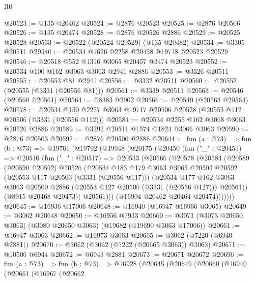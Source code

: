 \begin{lexlean}{R0}
\begin{coremodule}
@20523 := @135 @20462
@20524 := @2876 @20523
@20525 := @2876 @20506
@20526 := @135 @20474
@20528 := @2876 @20526 @2886
@20529 := @20525 @20528
@20533 := @20522 (@20524 @20529) (@135 @20482)
@20534 := @3305 @20511
@20540 := @20534 @1626 @2258 @20458 @19718 @20523 @20529
@20546 := @20518 @552 @1316 @3065 @20457 @3474 @20523
@20552 := @20534 @100 @162 @3063 @3063 @2941 @2886
@20553 := @3326 @20511
@20555 := @20553 @81 @2941
@20556 := @3332 @20511
@20560 := @20552 (@20555 (@3331 (@20556 @81)))
@20561 := @3339 @20511
@20563 := @20546 (@20560 @20561)
@20564 := @8383 @2902
@20566 := @20540 (@20563 @20564)
@20578 := @20534 @150 @2257 @3063 @19717 @20506 @20528 (@20553 @112 @20506 (@3331 (@20556 @112)))
@20584 := @20534 @2255 @162 @3068 @3063 @20526 @2886
@20589 := @3292 @20511 @1574 @1824 @3066 @3063
@20590 := @2876 @20503
@20592 := @2876 @20500 @2886
@20644 := fun (a : @73) =>
  fun (b : @73) =>
  @19761
    (@19792
      (@19948
        (@20175
          (@20450
            (fun ("_" : @20451) =>
            @20516
              (fun ("_" : @20517) =>
              @20533
                (@20566
                  (@20578
                    (@20584
                      (@20589
                        (@20590 @20592)
                        @20526
                        (@20534
                          @183
                          @179
                          @3063
                          @3065
                          @20503
                          @20592
                          (@20553 @117 @20503 (@3331 (@20556 @117)))
                          (@20534
                            @177
                            @162
                            @3063
                            @3063
                            @20500
                            @2886
                            (@20553 @127 @20500 (@3331 (@20556 @127)))
                            @20561))
                        (@8915 @20468 @20473))
                      @20561)))
                (@16904 @20462 @20464 @20474)))))))
@20645 := @16936 @17006
@20648 := @16940 (@16947 @16966 @3065)
@20649 := @3062 @20648
@20650 := @16956 @7933
@20660 := @3071 (@3073 @20650 @3063) (@3080 @20650 @3063) (@19682 (@19690 @3063 @17006))
@20661 := @16947 @3063
@20662 := @16973 @3063
@20665 := @3062 (@7220 (@6940 @2881))
@20670 := @3062 (@3062 (@7222 (@20665 @3063)) @3063)
@20671 := @10506 @6944
@20672 := @6943 @2881
@20673 := @20671 @20672
@20696 := fun (a : @73) =>
  fun (b : @73) =>
  @16928
    (@20645
      (@20649
        (@20660
          (@16940
            (@20661
              (@16967
                (@20662

\end{coremodule}
\end{lexlean}
